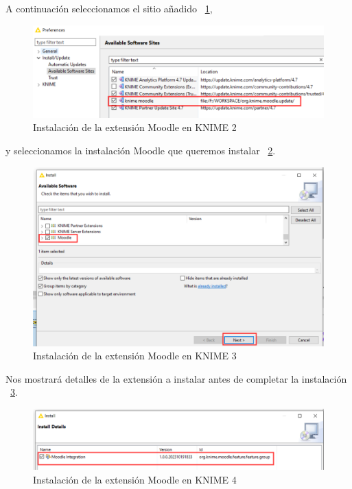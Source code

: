 A continuación seleccionamos el sitio añadido ~\ref{fig:usuario2},

\begin{figure}[!htb]
	\centering
	\includegraphics[width=1\textwidth]{img/manual_usuario_install_site_update2.png}
	\caption{Instalación de la extensión Moodle en KNIME 2}
	\label{fig:usuario2}
\end{figure}
\FloatBarrier

y seleccionamos la instalación Moodle que queremos instalar ~\ref{fig:usuario3}.

\begin{figure}[!htb]
	\centering
	\includegraphics[width=1\textwidth]{img/manual_usuario_install_site_update3.png}
	\caption{Instalación de la extensión Moodle en KNIME 3}
	\label{fig:usuario3}
\end{figure}
\FloatBarrier

Nos mostrará detalles de la extensión a instalar antes de completar la instalación ~\ref{fig:usuario4}. 

\begin{figure}[!htb]
	\centering
	\includegraphics[width=1\textwidth]{img/manual_usuario_install_site_update4.png}
	\caption{Instalación de la extensión Moodle en KNIME 4}
	\label{fig:usuario4}
\end{figure}
\FloatBarrier

